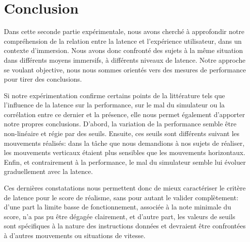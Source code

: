 \chapter*{Conclusion}
\par Dans cette seconde partie expérimentale, nous avons cherché à approfondir notre compréhension de la relation entre la latence et l'expérience utilisateur, dans un contexte d'immersion. Nous avons donc confronté des sujets à la même situation dans différents moyens immersifs, à différents niveaux de latence. Notre approche se voulant objective, nous nous sommes orientés vers des mesures de performance pour tirer des conclusions.

\par Si notre expérimentation confirme certains points de la littérature tels que l'influence de la latence sur la performance, sur le mal du simulateur ou la corrélation entre ce dernier et la présence, elle nous permet également d'apporter notre propres conclusions. D'abord, la variation de la performance semble être non-linéaire et régie par des seuils. Ensuite, ces seuils sont différents suivant les mouvements réalisés: dans la tâche que nous demandions à nos sujets de réaliser, les mouvements verticaux étaient plus sensibles que les mouvements horizontaux. Enfin, et contrairement à la performance, le mal du simulateur semble lui évoluer graduellement avec la latence.

\par Ces dernières constatations nous permettent donc de mieux caractériser le critère de latence pour le score de réalisme, sans pour autant le valider complètement: d'une part la limite basse de fonctionnement, associée à la note minimale du score, n'a pas pu être dégagée clairement, et d'autre part, les valeurs de seuils sont spécifiques à la nature des instructions données et devraient être confrontées à d'autres mouvements ou situations de vitesse.